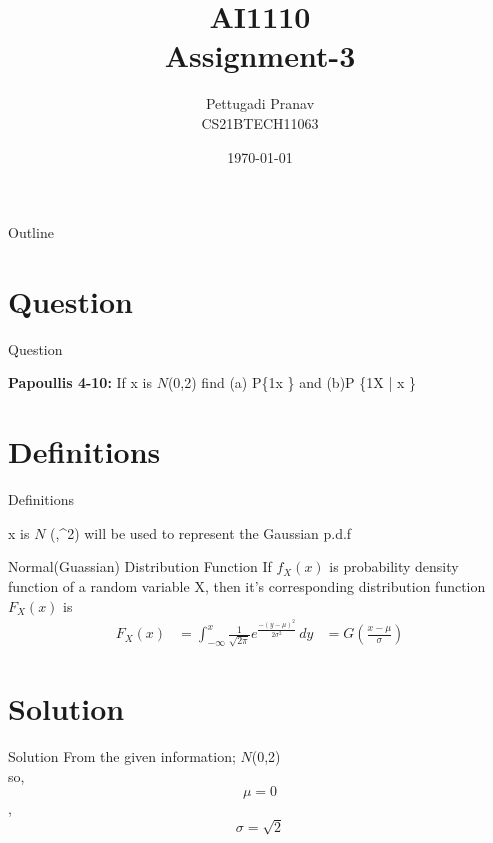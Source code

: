 \documentclass{beamer}
\title{AI1110 \\ Assignment-3}
\author{Pettugadi Pranav \\ CS21BTECH11063}
\date{\today}
\begin{document}
\begin{frame}
    \titlepage 
\end{frame}
\logo{}


\begin{frame}{Outline}
    \tableofcontents
\end{frame}



\section{Question}
\begin{frame}{Question}
    \begin{block}{\textbf{Papoullis 4-10:} } 
       If x is $N$(0,2) find (a) P\{1\le x \} and (b)P \{1\le X  | x \}
     \end{block}
     
\end{frame}


\section{Definitions}

\begin{frame}{Definitions}
\begin{block}{}
        x is $N$ (\mu ,\sigma^2) will  be  used to represent the Gaussian p.d.f
\end{block}
   \begin{block}{Normal(Guassian) Distribution Function}
      If $f_X(x)$ is probability density function of a random variable X, then it's corresponding  distribution function $F_X(x)$ is 
     \begin{align}
        F_X(x) 
              &= \int_{-\infty}^{x}\frac{1}{\sqrt{2\pi}} e^\frac{-(y-\mu)^2}{2\sigma^2} \, dy &= G(\frac{x-\mu}{\sigma}) \label{eq2} 
     \end{align}
   \end{block}	
\end{frame}



\section{Solution}
\begin{frame}{Solution}
  From the given information;
       $N$(0,2)\\
        so, $$\mu =0 $$,\\ $$\sigma =\sqrt{2} $$
  \end{frame}
  
\end{document}
